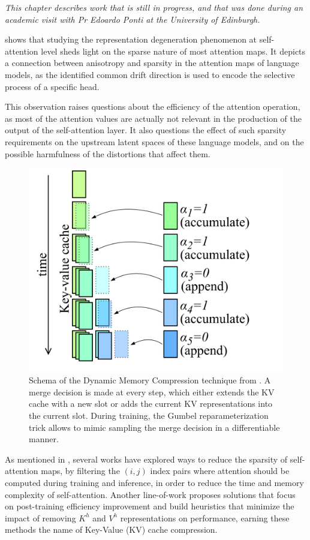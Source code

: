 \textit{This chapter describes work that is still in progress, and that was done during an academic visit with Pr Edoardo Ponti at the University of Edinburgh.}

\vspace{1em}

 shows that studying the representation degeneration phenomenon at self-attention level sheds light on the sparse nature of most attention maps. It depicts a connection between anisotropy and sparsity in the attention maps of language models, as the identified common drift direction is used to encode the selective process of a specific head.

This observation raises questions about the efficiency of the attention operation, as most of the attention values are actually not relevant in the production of the output of the self-attention layer. It also questions the effect of such sparsity requirements on the upstream latent spaces of these language models, and on the possible harmfulness of the distortions that affect them.

\begin{figure}[!b]
    \centering
    \includegraphics[width=0.6\linewidth]{sources/part_2/kv_cache/imgs/dmc_schema.png}
    \caption{Schema of the Dynamic Memory Compression technique from \citep{nawrot2024dynamic}. A merge decision is made at every step, which either extends the KV cache with a new slot or adds the current KV representations into the current slot. During training, the Gumbel reparameterization trick allows to mimic sampling the merge decision in a differentiable manner.}
    \label{fig:dmc_schema}
\end{figure}

As mentioned in , several works have explored ways to reduce the sparsity of self-attention maps, by filtering the $(i, j)$ index pairs where attention should be computed during training and inference, in order to reduce the time and memory complexity of self-attention. Another line-of-work proposes solutions that focus on post-training efficiency improvement and build heuristics that minimize the impact of removing $K^h$ and $V^h$ representations on performance, earning these methods the name of Key-Value (KV) cache compression. 

